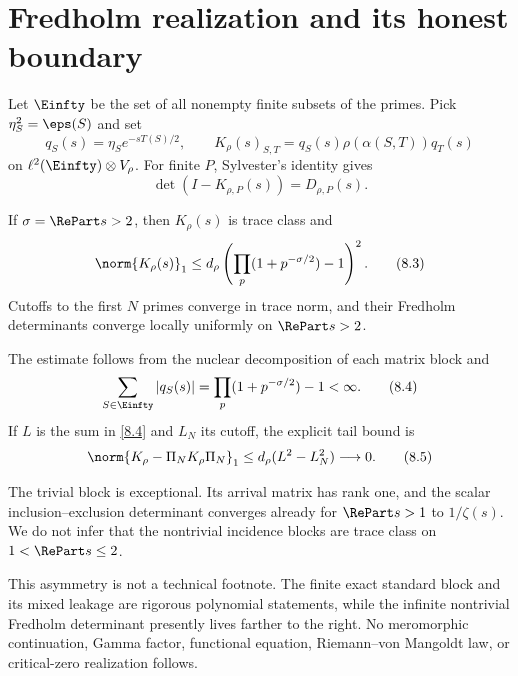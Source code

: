 \section{Fredholm realization and its honest boundary}
\label{sec:fredholm}

Let $\Einfty$ be the set of all nonempty finite subsets of the primes.  Pick
$\eta_S^2=\eps(S)$ and set
\[
 q_S(s)=\eta_S e^{-sT(S)/2},\qquad
 K_\rho(s)_{S,T}=q_S(s)\rho(\alpha(S,T))q_T(s)
 \tag{8.1}\label{8.1}
\]
on $\ell^2(\Einfty)\otimes V_\rho$.  For finite $P$, Sylvester's identity
gives
\[
 \det(I-K_{\rho,P}(s))=D_{\rho,P}(s).
 \tag{8.2}\label{8.2}
\]

\begin{theorem}
\label{thm:trace-class}
If $\sigma=\RePart s>2$, then $K_\rho(s)$ is trace class and
\[
 \norm{K_\rho(s)}_1
 \le d_\rho\left(
   \prod_p(1+p^{-\sigma/2})-1
 \right)^2.
 \tag{8.3}\label{8.3}
\]
Cutoffs to the first $N$ primes converge in trace norm, and their Fredholm
determinants converge locally uniformly on $\RePart s>2$.
\end{theorem}

The estimate follows from the nuclear decomposition of each matrix block and
\[
 \sum_{S\in\Einfty}|q_S(s)|
 =\prod_p(1+p^{-\sigma/2})-1<\infty.
 \tag{8.4}\label{8.4}
\]
If $L$ is the sum in \eqref{8.4} and $L_N$ its cutoff, the explicit tail
bound is
\[
 \norm{K_\rho-\Pi_NK_\rho\Pi_N}_1
 \le d_\rho(L^2-L_N^2)\longrightarrow0.
 \tag{8.5}\label{8.5}
\]

The trivial block is exceptional.  Its arrival matrix has rank one, and the
scalar inclusion--exclusion determinant converges already for
$\RePart s>1$ to $1/\zeta(s)$.  We do not infer that the nontrivial incidence
blocks are trace class on $1<\RePart s\le2$.

This asymmetry is not a technical footnote.  The finite exact standard block
and its mixed leakage are rigorous polynomial statements, while the
infinite nontrivial Fredholm determinant presently lives farther to the
right.  No meromorphic continuation, Gamma factor, functional equation,
Riemann--von Mangoldt law, or critical-zero realization follows.
